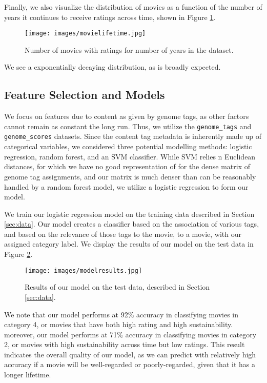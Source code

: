 \documentclass[12pt]{article}
\begin{document}
Finally, we also visualize the distribution of movies as a function of the number of years it continues to receive ratings across time, shown in Figure \ref{fig:movielifetime}. 

\begin{figure}
    \centering
    \texttt{[image: images/movielifetime.jpg]}
    \caption{Number of movies with ratings for number of years in the dataset.}
    \label{fig:movielifetime}
\end{figure}

We see a exponentially decaying distribution, as is broadly expected. 

\subsection{Feature Selection and Models}
\label{sec:model}
We focus on features due to content as given by genome tags, as other factors cannot remain as constant the long run. Thus, we utilize the \texttt{genome\_tags} and \texttt{genome\_scores} datasets. Since the content tag metadata is inherently made up of categorical variables, we considered three potential modelling methods: logistic regression, random forest, and an SVM classifier. While SVM relies n Euclidean distances, for which we have no good representation of for the dense matrix of genome tag assignments, and our matrix is much denser than can be reasonably handled by a random forest model, we utilize a logistic regression to form our model.

We train our logistic regression model on the training data described in Section \ref{sec:data}. Our model creates a classifier based on the association of various tags, and based on the relevance of those tags to the movie, to a movie, with our assigned category label. We display the results of our model on the test data in Figure \ref{fig:modelresults}.

\begin{figure}
    \centering
    \texttt{[image: images/modelresults.jpg]}
    \caption{Results of our model on the test data, described in Section \ref{sec:data}.}
    \label{fig:modelresults}
\end{figure}

We note that our model performs at 92\% accuracy in classifying movies in category 4, or movies that have both high rating and high sustainability. moreover, our model performs at 71\% accuracy in classifying movies in category 2, or movies with high sustainability across time but low ratings. This result indicates the overall quality of our model, as we can predict with relatively high accuracy if a movie will be well-regarded or poorly-regarded, given that it has a longer lifetime.
\end{document}
